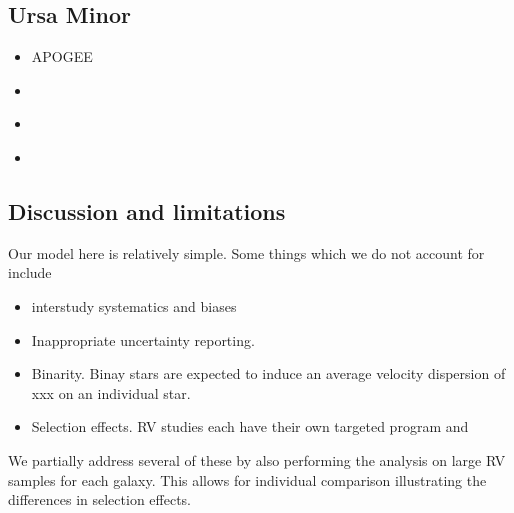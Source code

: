 \subsection{Ursa Minor}\label{ursa-minor}

\begin{itemize}
\tightlist
\item
  APOGEE
\item
  \citet{sestito+2024b}
\item
  \citet{pace+2022}
\item
  \citet{spencer+2018}
\end{itemize}

\subsection{Discussion and
limitations}\label{discussion-and-limitations}

Our model here is relatively simple. Some things which we do not account
for include

\begin{itemize}
\tightlist
\item
  interstudy systematics and biases
\item
  Inappropriate uncertainty reporting.
\item
  Binarity. Binay stars are expected to induce an average velocity
  dispersion of xxx on an individual star.
\item
  Selection effects. RV studies each have their own targeted program and
\end{itemize}

We partially address several of these by also performing the analysis on
large RV samples for each galaxy. This allows for individual comparison
illustrating the differences in selection effects.
